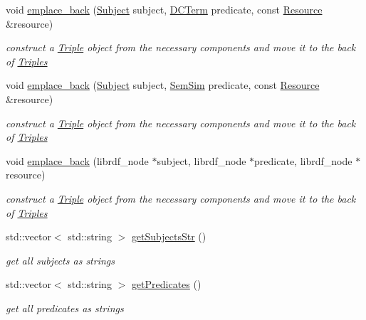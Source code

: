 \begin{DoxyCompactItemize}
void \hyperlink{classomexmeta_1_1Triples_a9f3f3152592f99ac95f65e0e7ce3b450}{emplace\+\_\+back} (\hyperlink{classomexmeta_1_1Subject}{Subject} subject, \hyperlink{classomexmeta_1_1DCTerm}{D\+C\+Term} predicate, const \hyperlink{classomexmeta_1_1Resource}{Resource} \&resource)
\begin{DoxyCompactList}\small\item\em construct a \hyperlink{classomexmeta_1_1Triple}{Triple} object from the necessary components and move it to the back of \hyperlink{classomexmeta_1_1Triples}{Triples} \end{DoxyCompactList}\item 
void \hyperlink{classomexmeta_1_1Triples_a55e7ed1c3212ae19d2189a386b81422e}{emplace\+\_\+back} (\hyperlink{classomexmeta_1_1Subject}{Subject} subject, \hyperlink{classomexmeta_1_1SemSim}{Sem\+Sim} predicate, const \hyperlink{classomexmeta_1_1Resource}{Resource} \&resource)
\begin{DoxyCompactList}\small\item\em construct a \hyperlink{classomexmeta_1_1Triple}{Triple} object from the necessary components and move it to the back of \hyperlink{classomexmeta_1_1Triples}{Triples} \end{DoxyCompactList}\item 
void \hyperlink{classomexmeta_1_1Triples_a3a8c150cff4d1e78aa360d62d3d6604e}{emplace\+\_\+back} (librdf\+\_\+node $\ast$subject, librdf\+\_\+node $\ast$predicate, librdf\+\_\+node $\ast$resource)
\begin{DoxyCompactList}\small\item\em construct a \hyperlink{classomexmeta_1_1Triple}{Triple} object from the necessary components and move it to the back of \hyperlink{classomexmeta_1_1Triples}{Triples} \end{DoxyCompactList}\item 
std\+::vector$<$ std\+::string $>$ \hyperlink{classomexmeta_1_1Triples_a5234882414a2aaaca603eacd805df3d6}{get\+Subjects\+Str} ()
\begin{DoxyCompactList}\small\item\em get all subjects as strings \end{DoxyCompactList}\item 
std\+::vector$<$ std\+::string $>$ \hyperlink{classomexmeta_1_1Triples_a63639c08caac19e6c5cbf30bb28292d0}{get\+Predicates} ()
\begin{DoxyCompactList}\small\item\em get all predicates as strings \end{DoxyCompactList}\item 

\end{DoxyCompactItemize}
